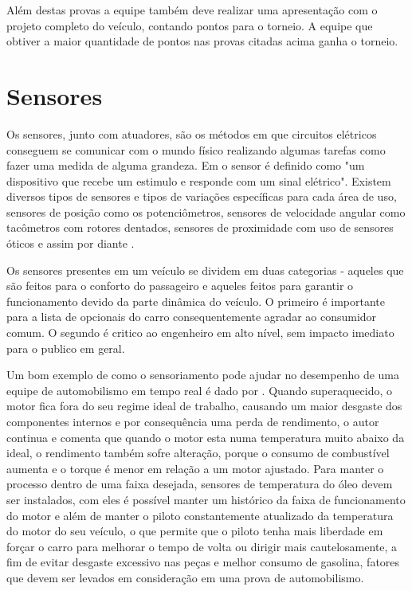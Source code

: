 Além destas provas a equipe também deve realizar uma apresentação com o projeto completo do veículo, contando pontos para o torneio. A equipe que obtiver a maior quantidade de pontos nas provas citadas acima ganha o torneio.

\section{Sensores}
\label{sec:sensores}
Os sensores, junto com atuadores, são os métodos em que circuitos elétricos conseguem se comunicar com o mundo físico realizando algumas tarefas como fazer uma medida de alguma grandeza. Em  o sensor é definido como "um dispositivo que recebe um estimulo e responde com um sinal elétrico". Existem diversos tipos de sensores e tipos de variações específicas para cada área de uso, sensores de posição como os potenciômetros, sensores de velocidade angular como tacômetros com rotores dentados, sensores de proximidade com uso de sensores óticos e assim por diante \cite{kilian2001modern}. 

Os sensores presentes em um veículo se dividem em duas categorias \cite{vehicleDataAcquisition2014} - aqueles que são feitos para o conforto do passageiro e aqueles feitos para garantir o funcionamento devido da parte dinâmica do veículo. O primeiro é importante para a lista de opcionais do carro consequentemente agradar ao consumidor comum. O segundo é critico ao engenheiro em alto nível, sem impacto imediato para o publico em geral.

Um bom exemplo de como o sensoriamento pode ajudar no desempenho de uma equipe de automobilismo em tempo real é dado por . Quando superaquecido, o motor fica fora do seu regime ideal de trabalho, causando um maior desgaste dos componentes internos e por consequência uma perda de rendimento, o autor continua e comenta que quando o motor esta numa temperatura muito abaixo da ideal, o rendimento também sofre alteração, porque o consumo de combustível aumenta e o torque é menor em relação a um motor ajustado. Para manter o processo dentro de uma faixa desejada, sensores de temperatura do óleo devem ser instalados, com eles é possível manter um histórico da faixa de funcionamento do motor e além de manter o piloto constantemente atualizado da temperatura do motor do seu veículo, o que permite que o piloto tenha mais liberdade em forçar o carro para melhorar o tempo de volta ou dirigir mais cautelosamente, a fim de evitar desgaste excessivo nas peças e melhor consumo de gasolina, fatores que devem ser levados em consideração em uma prova de automobilismo. 

